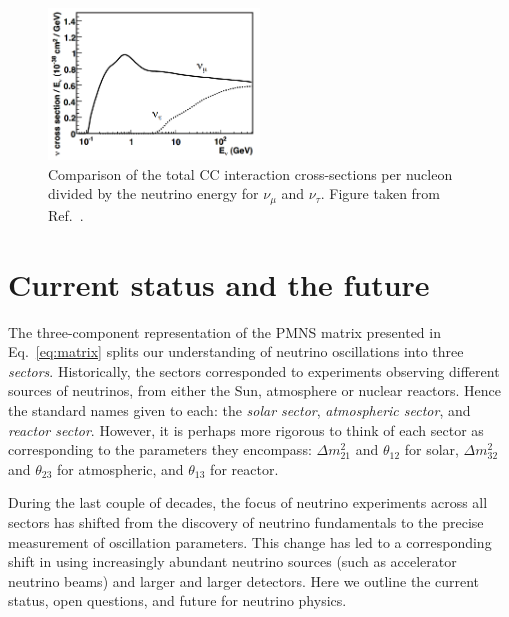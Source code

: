 \begin{figure} %
    \includegraphics[origin=c,width=0.5\textwidth]{diagrams/3-theory/tau_comparison.png}
    \caption[Total charged-current cross-section of $\nu_{\mu}$ and $\nu_{\tau}$]
    {Comparison of the total CC interaction cross-sections per nucleon divided by the neutrino
        energy for $\nu_{\mu}$ and $\nu_{\tau}$. Figure taken from Ref.~\cite{formaggio2012}.}
    \label{fig:tau_comparison}
\end{figure}

\section{Current status and the future} %
\label{sec:theory_status} %

The three-component representation of the PMNS matrix presented in Eq.~\ref{eq:matrix} splits our
understanding of neutrino oscillations into three \emph{sectors}. Historically, the sectors
corresponded to experiments observing different sources of neutrinos, from either the Sun,
atmosphere or nuclear reactors. Hence the standard names given to each: the \emph{solar sector},
\emph{atmospheric sector}, and \emph{reactor sector}. However, it is perhaps more rigorous to
think of each sector as corresponding to the parameters they encompass: $\Delta m^{2}_{21}$ and
$\theta_{12}$ for solar, $\Delta m^{2}_{32}$ and $\theta_{23}$ for atmospheric, and $\theta_{13}$
for reactor.

During the last couple of decades, the focus of neutrino experiments across all sectors has
shifted from the discovery of neutrino fundamentals to the precise measurement of oscillation
parameters. This change has led to a corresponding shift in using increasingly abundant neutrino
sources (such as accelerator neutrino beams) and larger and larger detectors. Here we outline the
current status, open questions, and future for neutrino physics.

